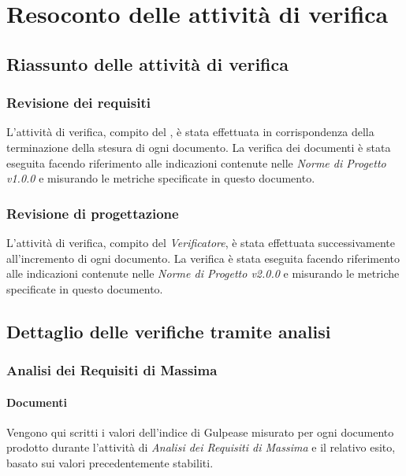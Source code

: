 \appendix
\section{Resoconto delle attività di verifica}
	\subsection{Riassunto delle attività di verifica}
	\subsubsection{Revisione dei requisiti}
	L'attività di verifica, compito del \emph{}, è stata effettuata in corrispondenza della terminazione della stesura di ogni documento. La verifica dei documenti è stata eseguita facendo riferimento alle indicazioni contenute nelle \emph{Norme di Progetto v1.0.0} e misurando le metriche specificate in questo documento.
	\subsubsection{Revisione di progettazione}
	L'attività di verifica, compito del \emph{Verificatore}, è stata effettuata successivamente all'incremento di ogni documento. La verifica è stata eseguita facendo riferimento alle indicazioni contenute nelle \emph{Norme di Progetto v2.0.0} e misurando le metriche specificate in questo documento.
	
	\subsection{Dettaglio delle verifiche tramite analisi}
	\subsubsection{Analisi dei Requisiti di Massima}
	\paragraph{Documenti} \Spazio
	Vengono qui scritti i valori dell'indice di Gulpease misurato per ogni documento prodotto durante l'attività di \textit{Analisi dei Requisiti di Massima} e il relativo esito, basato sui valori precedentemente stabiliti.
	
